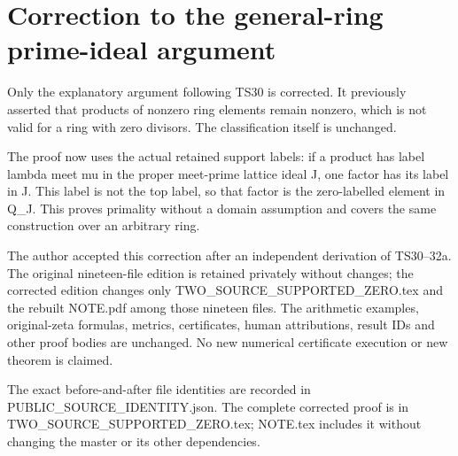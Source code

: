 \documentclass[
]{article}
\author{}
\date{}
\begin{document}
\section{Correction to the general-ring prime-ideal
argument}\label{correction-to-the-general-ring-prime-ideal-argument}

Only the explanatory argument following TS30 is corrected. It previously
asserted that products of nonzero ring elements remain nonzero, which is
not valid for a ring with zero divisors. The classification itself is
unchanged.

The proof now uses the actual retained support labels: if a product has
label lambda meet mu in the proper meet-prime lattice ideal J, one
factor has its label in J. This label is not the top label, so that
factor is the zero-labelled element in Q\_J. This proves primality
without a domain assumption and covers the same construction over an
arbitrary ring.

The author accepted this correction after an independent derivation of
TS30--32a. The original nineteen-file edition is retained privately
without changes; the corrected edition changes only
TWO\_SOURCE\_SUPPORTED\_ZERO.tex and the rebuilt NOTE.pdf among those
nineteen files. The arithmetic examples, original-zeta formulas,
metrics, certificates, human attributions, result IDs and other proof
bodies are unchanged. No new numerical certificate execution or new
theorem is claimed.

The exact before-and-after file identities are recorded in
PUBLIC\_SOURCE\_IDENTITY.json. The complete corrected proof is in
TWO\_SOURCE\_SUPPORTED\_ZERO.tex; NOTE.tex includes it without changing
the master or its other dependencies.
\end{document}

